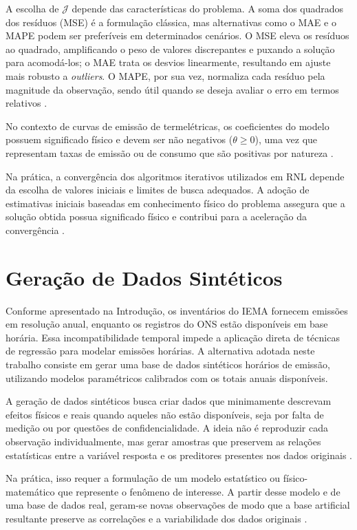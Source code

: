 A escolha de \(\mathcal{J}\) depende das características do problema. A soma dos quadrados dos resíduos (\ac{MSE}) é a formulação clássica, mas alternativas como o \ac{MAE} e o \ac{MAPE} podem ser preferíveis em determinados cenários. O \ac{MSE} eleva os resíduos ao quadrado, amplificando o peso de valores discrepantes e puxando a solução para acomodá-los; o \ac{MAE} trata os desvios linearmente, resultando em ajuste mais robusto a \textit{outliers}. O \ac{MAPE}, por sua vez, normaliza cada resíduo pela magnitude da observação, sendo útil quando se deseja avaliar o erro em termos relativos \cite{myttenaere2016mean}.

No contexto de curvas de emissão de termelétricas, os coeficientes do modelo possuem significado físico e devem ser não negativos (\(\theta \geq 0\)), uma vez que representam taxas de emissão ou de consumo que são positivas por natureza \cite{wood2013power}.

Na prática, a convergência dos algoritmos iterativos utilizados em \ac{RNL} depende da escolha de valores iniciais e limites de busca adequados. A adoção de estimativas iniciais baseadas em conhecimento físico do problema assegura que a solução obtida possua significado físico e contribui para a aceleração da convergência \cite{seber1989nonlinear}.

\section{Geração de Dados Sintéticos}

Conforme apresentado na Introdução, os inventários do \ac{IEMA} fornecem emissões em resolução anual, enquanto os registros do \ac{ONS} estão disponíveis em base horária. Essa incompatibilidade temporal impede a aplicação direta de técnicas de regressão para modelar emissões horárias. A alternativa adotada neste trabalho consiste em gerar uma base de dados sintéticos horários de emissão, utilizando modelos paramétricos calibrados com os totais anuais disponíveis.

A geração de dados sintéticos busca criar dados que minimamente descrevam efeitos físicos e reais quando aqueles não estão disponíveis, seja por falta de medição ou por questões de confidencialidade. A ideia não é reproduzir cada observação individualmente, mas gerar amostras que preservem as relações estatísticas entre a variável resposta e os preditores presentes nos dados originais \cite{nowok2016synthpop}.

Na prática, isso requer a formulação de um modelo estatístico ou físico-matemático que represente o fenômeno de interesse. A partir desse modelo e de uma base de dados real, geram-se novas observações de modo que a base artificial resultante preserve as correlações e a variabilidade dos dados originais \cite{nowok2016synthpop}.

